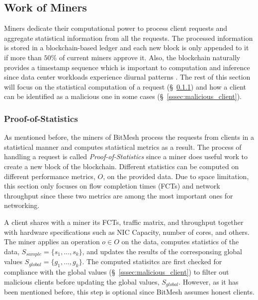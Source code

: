 \documentclass[11px]{article}
\newcommand{\projTitle}{BitMesh\xspace}
\begin{document}
\subsection{Work of Miners}\label{ssec:work_of_miners}
Miners dedicate their computational power to process client requests and aggregate statistical information from all the requests. The processed information is stored in a blockchain-based ledger and each new block is only appended to it if more than $50\%$ of current miners approve it. Also, the blockchain naturally provides a timestamp sequence which is important to computation and inference since data center workloads experience diurnal patterns \cite{diurnal_pattern_data_center_1, diurnal_pattern_data_center_2}. The rest of this section will focus on the statistical computation of a request (\S\ \ref{sssec:proof_of_statistics}) and how a client can be identified as a malicious one in some cases (\S\ \ref{sssec:malicious_client}).

\subsubsection{Proof-of-Statistics}\label{sssec:proof_of_statistics}
As mentioned before, the miners of \projTitle process the requests from clients in a statistical manner and computes statistical metrics as a result. The process of handling a request is called \textit{Proof-of-Statistics} since a miner does useful work to create a new block of the blockchain. Different statistics can be  computed on different performance metrics, $O$, on the provided data. Due to space limitation, this section only focuses on flow completion times (FCTs) and network throughput since these two metrics are among the most important ones for networking.

\noindent \newline A client shares with a miner its FCTs, traffic matrix, and throughput together with hardware specifications such as NIC Capacity, number of cores, and others. The miner applies an operation $o \in O$ on the data, computes statistics of the data, $S_{sample} = \{s_1, ..., s_k\}$, and updates the results of the corresponsing global values $S_{global} = \{g_1, ..., g_k\}$.
The computed statisitcs are first checked for compliance with the global values (\S\ \ref{sssec:malicious_client}) to filter out malicious clients before updating the global values, $S_{global}$. However, as it has been mentioned before, this step is optional since  \projTitle assumes honest clients.
\end{document}
